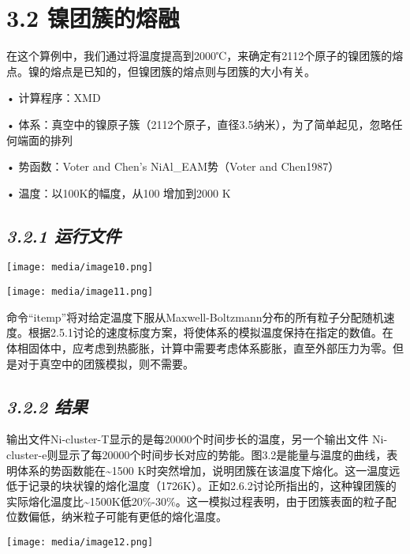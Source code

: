 \documentclass[
]{article}
\begin{document}
\hypertarget{ux954dux56e2ux7c07ux7684ux7194ux878d}{%
\section{3.2 镍团簇的熔融}\label{ux954dux56e2ux7c07ux7684ux7194ux878d}}

在这个算例中，我们通过将温度提高到2000℃，来确定有2112个原子的镍团簇的熔点。镍的熔点是已知的，但镍团簇的熔点则与团簇的大小有关。

• 计算程序：XMD

•
体系：真空中的镍原子簇（2112个原子，直径3.5纳米），为了简单起见，忽略任何端面的排列

• 势函数：Voter and Chen's NiAl\_EAM势（Voter and Chen1987）

• 温度：以100K的幅度，从100 增加到2000 K

\hypertarget{ux8fd0ux884cux6587ux4ef6}{%
\subsection{\texorpdfstring{\emph{3.2.1
运行文件}}{3.2.1 运行文件}}\label{ux8fd0ux884cux6587ux4ef6}}

\texttt{[image: media/image10.png]}

\texttt{[image: media/image11.png]}

命令``itemp''将对给定温度下服从Maxwell-Boltzmann分布的所有粒子分配随机速度。根据2.5.1讨论的速度标度方案，将使体系的模拟温度保持在指定的数值。在体相固体中，应考虑到热膨胀，计算中需要考虑体系膨胀，直至外部压力为零。但是对于真空中的团簇模拟，则不需要。

\hypertarget{ux7ed3ux679c-1}{%
\subsection{\texorpdfstring{\emph{3.2.2
结果}}{3.2.2 结果}}\label{ux7ed3ux679c-1}}

输出文件Ni-cluster-T显示的是每20000个时间步长的温度，另一个输出文件
Ni-cluster-e则显示了每20000个时间步长对应的势能。图3.2是能量与温度的曲线，表明体系的势函数能在\textasciitilde1500
K时突然增加，说明团簇在该温度下熔化。这一温度远低于记录的块状镍的熔化温度（1726K）。正如2.6.2讨论所指出的，这种镍团簇的实际熔化温度比\textasciitilde1500K低20\%-30\%。这一模拟过程表明，由于团簇表面的粒子配位数偏低，纳米粒子可能有更低的熔化温度。

\texttt{[image: media/image12.png]}
\end{document}
